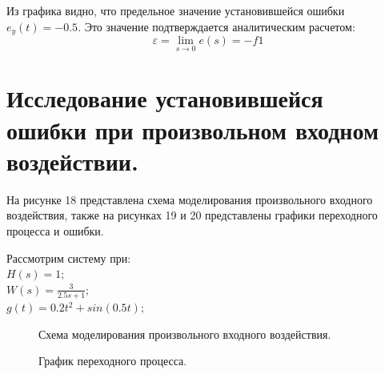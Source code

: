 \documentclass[a4paper, 11pt]{article}
\begin{document}
Из графика видно, что предельное значение установившейся ошибки $e_y(t)=-0.5$. Это значение подтверждается аналитическим расчетом:
\begin{equation}
	\varepsilon = \lim_{s\to 0}{e(s)} = -f1
\end{equation}

\newpage

\section*{Исследование установившейся ошибки при произвольном входном воздействии.} 
На рисунке 18 представлена схема моделирования произвольного входного воздействия, также на рисунках 19 и 20 представлены графики переходного процесса и ошибки.

Рассмотрим систему при:\\

$H(s)=1;$ \\

$W(s)=\frac {3} {2.5s+1};$ \\

$g(t)=0.2t^2+sin(0.5t);$

\begin{figure}[h!]
    \caption{Схема моделирования произвольного входного воздействия.}
    \label{two}
\end{figure}

\begin{figure}[h!]
    \caption{График переходного процесса.}
    \label{two}
\end{figure}
\end{document}
